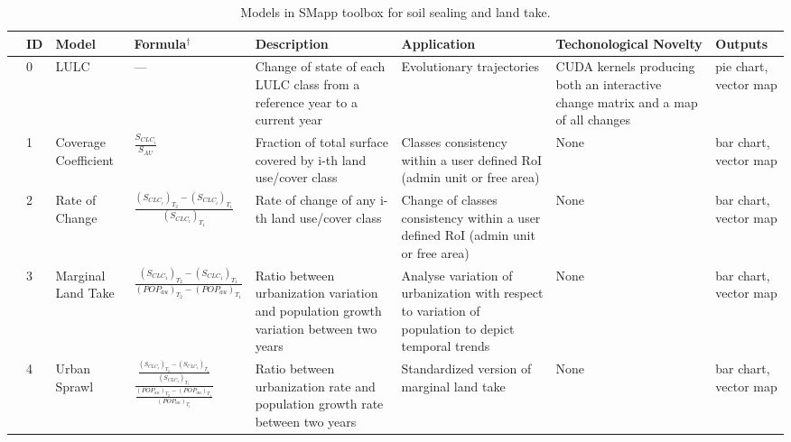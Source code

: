 \documentclass[APA,LATO1COL,doublespace]{WileyNJD-v2}
\begin{document}
\begin{table}[b]
    \caption{ Models in SMapp toolbox for soil sealing and land take. }
    \label{tab:SMappToolbox}
    \small
    \centering
    \begin{tabular}{m{0.3cm} p{0.1cm} p{1.2cm} p{3.5cm} *{3}{p{2.7cm}} p{1.0cm} }
    
    \toprule
        & \textbf{ID} & \textbf{Model} & \textbf{Formula$^\dagger$} & \textbf{Description} & \textbf{Application} & \textbf{Techonological Novelty} & \textbf{Outputs}\\
    \midrule\midrule
    
    & 0 & LULC & --- & Change of state of each LULC class from a reference year to a current year & Evolutionary trajectories & CUDA kernels producing both an interactive change matrix and a map of all changes & pie chart, vector map  \\
    
    & 1	& Coverage Coefficient & $\frac{S_{CLC_i}}{S_{AU}}$ & Fraction of total surface covered by i-th land use/cover class & Classes consistency within a user defined RoI (admin unit or free area) & None & bar chart, vector map \\
        
    & 2 & Rate of Change & 
    $\frac{ \left(S_{CLC_i}\right)_{T_2} - \left(S_{CLC_i}\right)_{T_1} }{ \left(S_{CLC_i}\right)_{T_1} }$ 
    & Rate of change of any i-th land use/cover class & Change of classes consistency within a user defined RoI (admin unit or free area) & None & bar chart, vector map \\
    
    & 3 & Marginal Land Take & 
    $\frac{ \left(S_{CLC_1}\right)_{T_2} - \left(S_{CLC_1}\right)_{T_1} }{ \left(POP_{au}\right)_{T_2} - \left(POP_{au}\right)_{T_1} }$
    & Ratio between urbanization variation and population growth variation between two years & Analyse variation of urbanization with respect to variation of population to depict temporal trends & None & bar chart, vector map \\
    
    & 4	& Urban Sprawl & 
    $\frac{ \frac{ \left(S_{CLC_1}\right)_{T_2} - \left(S_{CLC_1}\right)_{T_1} }{ \left(S_{CLC_1}\right)_{T_1} }  }     { \frac{ \left(POP_{au}\right)_{T_2} - \left(POP_{au}\right)_{T_1} }{ \left(POP_{au}\right)_{T_1} } }$
    & Ratio between urbanization rate and population growth rate between two years & Standardized version of marginal land take & None & bar chart, vector map \\
    

\end{tabular}
\end{table}
\end{document}
